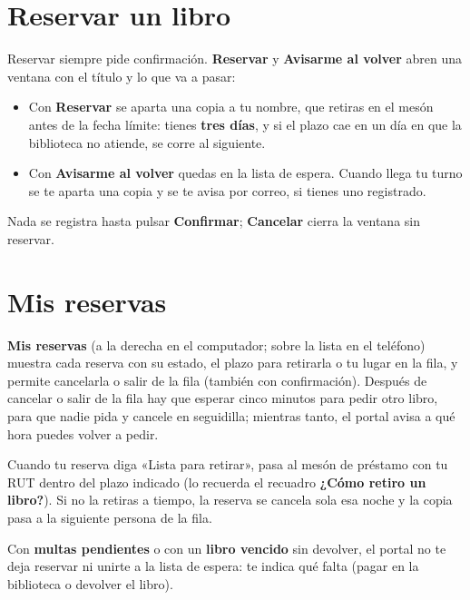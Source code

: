 \documentclass[11pt,a4paper]{report}
\begin{document}

\section{Reservar un libro}

Reservar siempre pide confirmación. \textbf{Reservar} y \textbf{Avisarme
al volver} abren una ventana con el título y lo que va a pasar:

\begin{itemize}
  \item Con \textbf{Reservar} se aparta una copia a tu nombre, que retiras
  en el mesón antes de la fecha límite: tienes \textbf{tres días}, y si el
  plazo cae en un día en que la biblioteca no atiende, se corre al
  siguiente.
  \item Con \textbf{Avisarme al volver} quedas en la lista de espera.
  Cuando llega tu turno se te aparta una copia y se te avisa por correo, si
  tienes uno registrado.
\end{itemize}

Nada se registra hasta pulsar \textbf{Confirmar}; \textbf{Cancelar} cierra
la ventana sin reservar.


\section{Mis reservas}

\textbf{Mis reservas} (a la derecha en el computador; sobre la lista en el
teléfono) muestra cada reserva con su estado, el plazo para retirarla o tu
lugar en la fila, y permite cancelarla o salir de la fila (también con
confirmación). Después de cancelar o salir de la fila hay que esperar cinco
minutos para pedir otro libro, para que nadie pida y cancele en seguidilla;
mientras tanto, el portal avisa a qué hora puedes volver a pedir.

Cuando tu reserva diga «Lista para retirar», pasa al mesón de préstamo con
tu RUT dentro del plazo indicado (lo recuerda el recuadro \textbf{¿Cómo
retiro un libro?}). Si no la retiras a tiempo, la reserva se cancela sola
esa noche y la copia pasa a la siguiente persona de la fila.

\begin{importante}
Con \textbf{multas pendientes} o con un \textbf{libro vencido} sin
devolver, el portal no te deja reservar ni unirte a la lista de espera: te
indica qué falta (pagar en la biblioteca o devolver el libro).
\end{importante}
\end{document}

